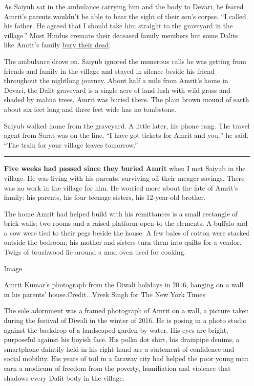 As Saiyub sat in the ambulance carrying him and the body to Devari, he
feared Amrit's parents wouldn't be able to bear the sight of their son's
corpse. ``I called his father. He agreed that I should take him straight
to the graveyard in the village.'' Most Hindus cremate their deceased
family members but some Dalits like Amrit's family
\href{https://www.reuters.com/article/us-india-landrights-caste-trfn/denied-in-life-indias-lower-caste-dalits-fight-for-land-in-death-idUSKBN20T0T1}{bury
their dead}.

The ambulance drove on. Saiyub ignored the numerous calls he was getting
from friends and family in the village and stayed in silence beside his
friend throughout the nightlong journey. About half a mile from Amrit's
home in Devari, the Dalit graveyard is a single acre of land lush with
wild grass and shaded by mahua trees. Amrit was buried there. The plain
brown mound of earth about six feet long and three feet wide has no
tombstone.

Saiyub walked home from the graveyard. A little later, his phone rang.
The travel agent from Surat was on the line. ``I have got tickets for
Amrit and you,'' he said. ``The train for your village leaves
tomorrow.''

\begin{center}\rule{0.5\linewidth}{\linethickness}\end{center}

\textbf{Five weeks had passed since they buried Amrit} when I met Saiyub
in the village. He was living with his parents, surviving off their
meager savings. There was no work in the village for him. He worried
more about the fate of Amrit's family: his parents, his four teenage
sisters, his 12-year-old brother.

The home Amrit had helped build with his remittances is a small
rectangle of brick walls: two rooms and a raised platform open to the
elements. A buffalo and a cow were tied to their pegs beside the house.
A few bales of cotton were stacked outside the bedroom; his mother and
sisters turn them into quilts for a vendor. Twigs of brushwood lie
around a mud oven used for cooking.

Image

Amrit Kumar's photograph from the Diwali holidays in 2016, hanging on a
wall in his parents' house.Credit...Vivek Singh for The New York Times

The sole adornment was a framed photograph of Amrit on a wall, a picture
taken during the festival of Diwali in the winter of 2016. He is posing
in a photo studio against the backdrop of a landscaped garden by water.
His eyes are bright, purposeful against his boyish face. His polka dot
shirt, his drainpipe denims, a smartphone daintily held in his right
hand are a statement of confidence and social mobility. His years of
toil in a faraway city had helped the poor young man earn a modicum of
freedom from the poverty, humiliation and violence that shadows every
Dalit body in the village.

